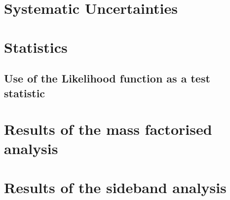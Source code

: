 \section{Systematic Uncertainties}
\label{sec:systematics}
\section{Statistics}
\subsection{Use of the Likelihood function as a test statistic}

\section{Results of the mass factorised analysis}

\section{Results of the sideband analysis}
